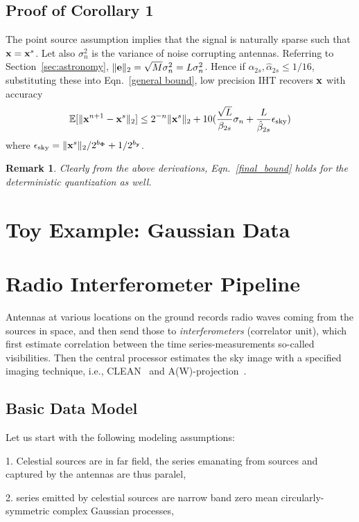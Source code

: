 \documentclass[article]{imsart}
\newtheorem{remark}{Remark}
\begin{document}
\subsection{Proof of Corollary 1}
The point source assumption implies that the signal is naturally sparse such that ${\bf x} = {\bf x}^s$. Let also $\sigma_n^2$ is the variance of noise corrupting antennas. Referring to Section~\ref{sec:astronomy}, $\|{\bf e} \|_2 = \sqrt{M}\sigma_n^2 = L\sigma_n^2$. Hence if $\alpha_{2s}, \hat{\alpha}_{2s}\leq 1/16$, substituting these into Eqn.~\ref{general bound}, low precision IHT recovers ${\bf x}$ with accuracy
\begin{equation}\label{final_bound}
    \mathbb{E}[\|{\bf x}^{n+1} - {\bf x}^s \|_2] \leq 2^{-n}\| {\bf x}^s\|_2 + 10(\frac{\sqrt{L}}{\beta_{2s}}\sigma_n+\frac{L}{\hat{\beta}_{2s}}\epsilon_{\rm{sky}})
\end{equation}
where $\epsilon_{\rm{sky}} =  \|{\bf x}^s \|_2/2^{b_{\bf \Phi}} + 1/2^{b_{\bf y}}$.
\begin{remark}
Clearly from the above derivations, Eqn.~\ref{final_bound} holds for the deterministic quantization as well.
\end{remark}
\section{Toy Example: Gaussian Data}
\section{Radio Interferometer Pipeline}
Antennas at various locations on the ground records radio waves coming from the sources in space, and then send those to {\it interferometers} (correlator unit), which first estimate correlation between the time series-measurements so-called visibilities. Then the central processor estimates the sky image with a specified imaging technique, i.e., {CLEAN}~\cite{hogbom1974clean} and A(W)-projection~\cite{bhatganar2008ra}. 
\subsection{Basic Data Model}

Let us start with the following modeling assumptions:~\cite{perley}

1. Celestial sources are in far field, the series emanating from sources and captured by the antennas are thus paralel,
  
2.  series emitted by celestial sources are narrow band zero mean circularly-symmetric complex Gaussian processes,
    
\end{document}
